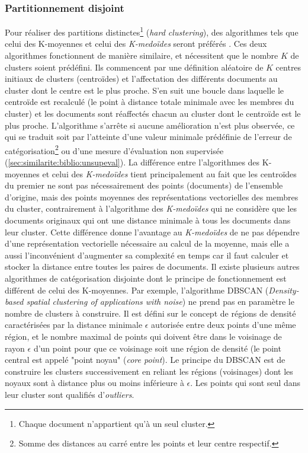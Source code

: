 \subsubsection{Partitionnement disjoint}
Pour réaliser des partitions distinctes\footnote{Chaque document n'appartient qu'à un seul cluster.} (\textit{hard clustering}), des algorithmes tels que celui des K-moyennes \citep{forgey1965kmeans} et celui des \textit{K-medoïdes} \citep{kaufman1987kmedoids} seront préférés \citep{balabantaray2015kmeanskmedoids}. Ces deux algorithmes fonctionnent de manière similaire, et nécessitent que le nombre $K$ de clusters soient prédéfini. Ils commencent par une définition aléatoire de $K$ centres initiaux de clusters (centroïdes) et l'affectation des différents documents au cluster dont le centre est le plus proche. S'en suit une boucle dans laquelle le centroïde est recalculé (le point à distance totale minimale avec les membres du cluster) et les documents sont réaffectés chacun au cluster dont le centroïde est le plus proche. L'algorithme s'arrête si aucune amélioration n'est plus observée, ce qui se traduit soit par l'atteinte d'une valeur minimale prédéfinie de l'erreur de catégorisation\footnote{Somme des distances au carré entre les points et leur centre respectif.} ou d'une mesure d'évaluation non supervisée (\ref{sec:similarite:biblio:unsupeval}). La différence entre l'algorithmes des K-moyennes et celui des \textit{K-medoïdes} tient principalement au fait que les centroïdes du premier ne sont pas nécessairement des points (documents) de l'ensemble d'origine, mais des points moyennes des représentations vectorielles des membres du cluster, contrairement à l'algorithme des \textit{K-medoïdes} qui ne considère que les documents originaux qui ont une distance minimale à tous les documents dans leur cluster. Cette différence donne l'avantage au \textit{K-medoïdes} de ne pas dépendre d'une représentation vectorielle nécessaire au calcul de la moyenne, mais elle a aussi l'inconvénient d'augmenter sa complexité en temps  car il faut calculer et stocker la distance entre toutes les paires de documents. Il existe plusieurs autres algorithmes de catégorisation disjointe dont le principe de fonctionnement est différent de celui des K-moyennes. Par exemple, l'algorithme DBSCAN (\textit{Density-based spatial clustering of applications with noise}) \citep{ester1996dbscan}  ne prend pas en paramètre le nombre de clusters à construire. Il est défini sur le concept de régions de densité caractérisées par la distance minimale $\epsilon$ autorisée entre deux points d'une même région, et le nombre maximal de points qui doivent être dans le voisinage de rayon $\epsilon$ d'un point pour que ce voisinage soit une région de densité (le point central est appelé "point noyau" (\textit{core point}). Le principe du DBSCAN est de construire les clusters successivement en reliant les régions (voisinages) dont les noyaux sont à distance plus ou moins inférieure à $\epsilon$. Les points qui sont seul dans leur cluster sont qualifiés d'\textit{outliers}. 

